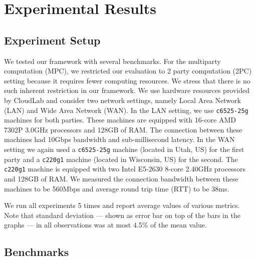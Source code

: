 \section{Experimental Results}
\label{sec:results}

\subsection{Experiment Setup}\label{sec:experiment_setup}
We tested our framework with several benchmarks. For the multiparty computation (MPC), we restricted our evaluation to 2 party computation (2PC) setting because it requires fewer computing resources. We stress that there is no such inherent restriction in our framework. We use hardware resources provided by CloudLab\cite{DuplyakinATC19} and consider two network settings, namely Local Area Network (LAN) and Wide Area Network (WAN). In the LAN setting, we use {\tt c6525-25g} machines for both parties. These machines are equipped with 16-core AMD 7302P 3.0GHz processors and 128GB of RAM. The connection between these machines had 10Gbps bandwidth and sub-millisecond latency. %
In the WAN setting we again used a {\tt c6525-25g} machine (located in Utah, US) for the first party and a {\tt c220g1} machine (located in Wisconsin, US) for the second. The {\tt c220g1} machine is equipped with two Intel E5-2630 8-core 2.40GHz processors and 128GB of RAM. We measured the connection bandwidth between these machines to be 560Mbps and average round trip time (RTT) to be 38ms. %

We run all experiments 5 times and report average values of various metrics. Note that standard deviation --- shown as error bar on top of the bars in the graphs --- in all observations was at most 4.5\% of the mean value. %

\subsection{Benchmarks}\label{sec:benchmarks_description}

